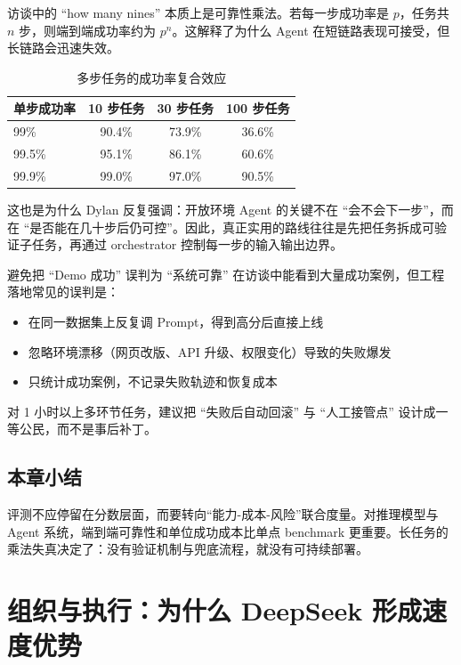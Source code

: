 \documentclass[a4paper]{article}
\begin{document}
访谈中的 ``how many nines'' 本质上是可靠性乘法。若每一步成功率是 $p$，任务共 $n$ 步，则端到端成功率约为 $p^n$。这解释了为什么 Agent 在短链路表现可接受，但长链路会迅速失效。

\begin{table}[H]
\centering
\begin{tabular}{lccc}
\toprule
\textbf{单步成功率} & \textbf{10 步任务} & \textbf{30 步任务} & \textbf{100 步任务} \\
\midrule
99\% & 90.4\% & 73.9\% & 36.6\% \\
99.5\% & 95.1\% & 86.1\% & 60.6\% \\
99.9\% & 99.0\% & 97.0\% & 90.5\% \\
\bottomrule
\end{tabular}
\caption{多步任务的成功率复合效应}
\end{table}

这也是为什么 Dylan 反复强调：开放环境 Agent 的关键不在 ``会不会下一步''，而在 ``是否能在几十步后仍可控''。因此，真正实用的路线往往是先把任务拆成可验证子任务，再通过 orchestrator 控制每一步的输入输出边界。

\begin{warningbox}{避免把 ``Demo 成功'' 误判为 ``系统可靠''}
在访谈中能看到大量成功案例，但工程落地常见的误判是：
\begin{itemize}
    \item 在同一数据集上反复调 Prompt，得到高分后直接上线
    \item 忽略环境漂移（网页改版、API 升级、权限变化）导致的失败爆发
    \item 只统计成功案例，不记录失败轨迹和恢复成本
\end{itemize}

对 1 小时以上多环节任务，建议把 ``失败后自动回滚'' 与 ``人工接管点'' 设计成一等公民，而不是事后补丁。
\end{warningbox}

\subsection{本章小结}

评测不应停留在分数层面，而要转向``能力-成本-风险''联合度量。对推理模型与 Agent 系统，端到端可靠性和单位成功成本比单点 benchmark 更重要。长任务的乘法失真决定了：没有验证机制与兜底流程，就没有可持续部署。

\section{组织与执行：为什么 DeepSeek 形成速度优势}
\end{document}
